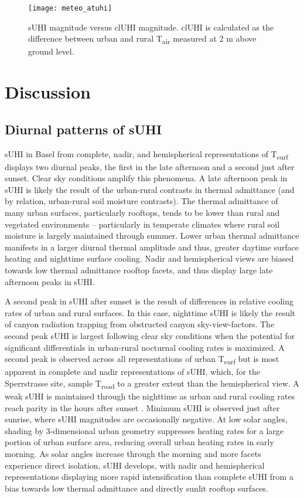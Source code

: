 \begin{figure}[H]
	\centering
	\texttt{[image: meteo\_atuhi]}
	\caption{sUHI magnitude versus clUHI magnitude. clUHI is calculated as the difference between urban and rural T\textsubscript{air} measured at 2 \si{\meter} above ground level.}
	\label{meteo_atuhi}
\end{figure}

\section{Discussion}

\subsection{Diurnal patterns of sUHI}

sUHI in Basel from complete, nadir, and hemispherical representations of T\textsubscript{surf} displays two diurnal peaks, the first in the late afternoon and a second just after sunset. Clear sky conditions amplify this phenomena. A late afternoon peak in sUHI is likely the result of the urban-rural contrasts in thermal admittance (and by relation, urban-rural soil moisture contrasts). The thermal admittance of many urban surfaces, particularly rooftops, tends to be lower than rural and vegetated environments \citep{Spronken-Smith1998} – particularly in temperate climates where rural soil moisture is largely maintained through summer. Lower urban thermal admittance manifests in a larger diurnal thermal amplitude and thus, greater daytime surface heating and nighttime surface cooling. Nadir and hemispherical views are biased towards low thermal admittance rooftop facets, and thus display large late afternoon peaks in sUHI.

A second peak in sUHI after sunset is the result of differences in relative cooling rates of urban and rural surfaces. In this case, nighttime sUHI is likely the result of canyon radiation trapping from obstructed canyon sky-view-factors. The second peak sUHI is largest following clear sky conditions when the potential for significant differentials in urban-rural nocturnal cooling rates is maximized. A second peak is observed across all representations of urban T\textsubscript{surf} but is most apparent in complete and nadir representations of sUHI, which, for the Sperrstrasse site, sample T\textsubscript{road} to a greater extent than the hemispherical view. A weak sUHI is maintained through the nighttime as urban and rural cooling rates reach parity in the hours after sunset \citep{Oke2017}. Minimum sUHI is observed just after sunrise, where sUHI magnitudes are occasionally negative. At low solar angles, shading by 3-dimensional urban geometry suppresses heating rates for a large portion of urban surface area, reducing overall urban heating rates in early morning. As solar angles increase through the morning and more facets experience direct isolation, sUHI develops, with nadir and hemispherical representations displaying more rapid intensification than complete sUHI from a bias towards low thermal admittance and directly sunlit rooftop surfaces.

